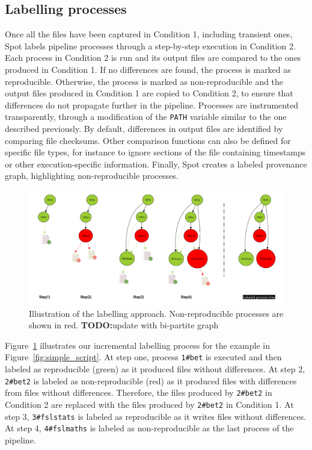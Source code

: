 \documentclass[a4paper,num-refs]{oup-contemporary}
\newcommand{\todo}[1]{\color{red}\textbf{TODO:}#1\color{black}}
\newcommand{\toolname}[0]{Spot\xspace}
\begin{document}
\subsection{Labelling processes} 

Once all the files have been captured in Condition 1, including transient
ones, \toolname labels pipeline processes through a step-by-step execution
in Condition 2. Each process in Condition 2 is run and its output files are
compared to the ones produced in Condition 1. If no differences are found,
the process is marked as reproducible. Otherwise, the process is marked as
non-reproducible and the output files produced in Condition 1 are copied to
Condition 2, to ensure that differences do not propagate further in the
pipeline. Processes are instrumented transparently, through a modification
of the \texttt{PATH} variable similar to the one described previously. By
default, differences in output files are identified by comparing file
checksums. Other comparison functions can also be defined for specific file
types, for instance to ignore sections of the file containing timestamps or
other execution-specific information. Finally, \toolname creates a labeled
provenance graph, highlighting non-reproducible processes.

\begin{figure}
  \centering
  \includegraphics[width=\columnwidth]{images/iterative_modif}
  \caption{Illustration of the labelling approach. Non-reproducible processes are shown in red. \todo{update with bi-partite graph}}
  \label{fig:iterations}
\end{figure}

Figure~\ref{fig:iterations} illustrates our incremental labelling 
process for the example in Figure~\ref{fig:simple_script}. 
At step one, process \texttt{1\#bet} is executed and then labeled 
as reproducible (green) as it produced files without differences.
At step 2, \texttt{2\#bet2} 
is labeled as non-reproducible (red) as it produced files with differences 
from files without differences. Therefore, the files produced by \texttt{2\#bet2} in  
Condition 2 are replaced with the files produced by \texttt{2\#bet2} in 
Condition 1.
At step 3, \texttt{3\#fslstats} is labeled as 
reproducible as it writes files without differences.
At step 4, \texttt{4\#fslmaths} is labeled as non-reproducible 
as the last process of the pipeline.
\end{document}
